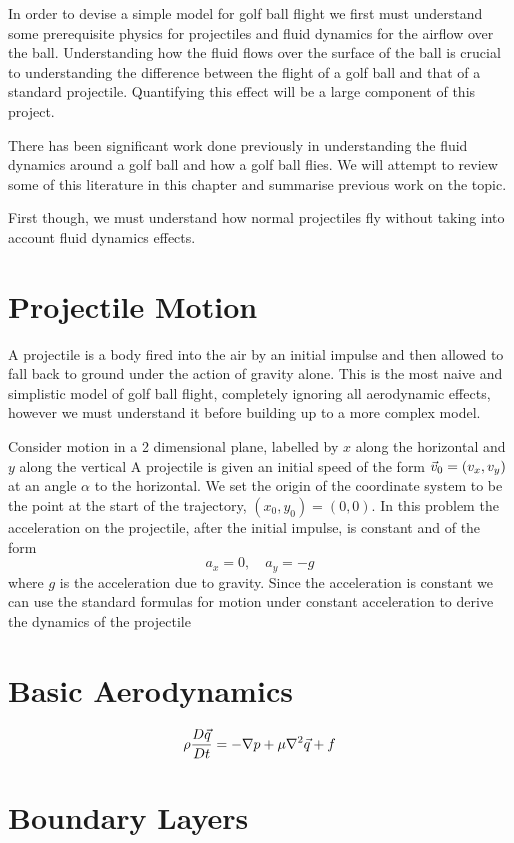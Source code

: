 In order to devise a simple model for golf ball flight we first must understand some
prerequisite physics for projectiles and fluid dynamics for the airflow over the ball. Understanding
how the fluid flows over the surface of the ball is crucial to understanding the difference between
the flight of a golf ball and that of a standard projectile. Quantifying this effect will be a large
component of this project.

There has been significant work done previously in understanding the fluid dynamics around a golf ball
and how a golf ball flies. We will attempt to review some of this literature in this chapter and summarise
previous work on the topic.

First though, we must understand how normal projectiles fly without taking into account fluid dynamics effects.
\section{Projectile Motion}
A projectile is a body fired into the air by an initial impulse and then allowed to fall back to ground under the
action of gravity alone. This is the most naive and simplistic model of golf ball flight, completely
ignoring all aerodynamic effects, however we must understand it before building up to a more
complex model.

Consider motion in a 2 dimensional plane, labelled by $x$ along the horizontal and $y$ along the vertical
A projectile is given an initial speed of the form $\vec{v}_0 = (v_x, v_y)$ at an angle $\alpha$ to
the horizontal. We set the origin of the coordinate system to be the point at the start of the
trajectory, $(x_0, y_0) = (0,0)$. In this problem the acceleration on the projectile, after the initial
impulse, is constant and of the form
\begin{equation}
a_x = 0, \quad a_y = -g
\end{equation}
where $g$ is the acceleration due to gravity. Since the acceleration is constant we can use
the standard formulas for motion under constant acceleration to derive the dynamics of the
projectile \citet{yandf}
\section{Basic Aerodynamics}\begin{equation}
\rho \frac{D\vec{q}}{Dt} = - \nabla p + \mu \nabla^2 \vec{q} + f
\end{equation}

\section{Boundary Layers}

